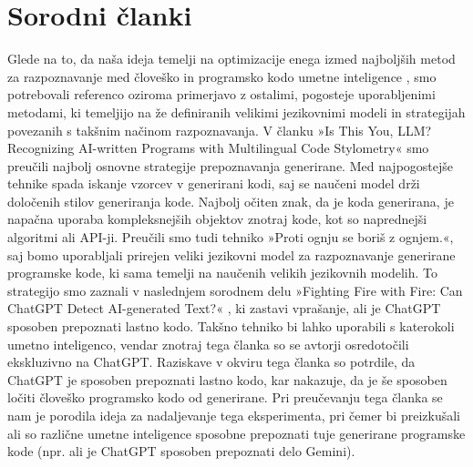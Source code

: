 \documentclass[sigconf,nonacm]{acmart}
\begin{document}
\section{Sorodni članki}
Glede na to, da naša ideja temelji na optimizacije enega izmed najboljših metod za razpoznavanje med človeško in programsko kodo umetne inteligence \cite{oedingen2024chatgpt}, smo potrebovali referenco oziroma primerjavo z ostalimi, pogosteje uporabljenimi metodami, ki temeljijo na že definiranih velikimi jezikovnimi modeli in strategijah povezanih s takšnim načinom razpoznavanja.
V članku »Is This You, LLM? Recognizing AI-written Programs with Multilingual Code Stylometry« \cite{gurioli2024you} smo preučili najbolj osnovne strategije prepoznavanja generirane. Med najpogostejše tehnike spada iskanje vzorcev v generirani kodi, saj se naučeni model drži določenih stilov generiranja kode. Najbolj očiten znak, da je koda generirana, je napačna uporaba kompleksnejših objektov znotraj kode, kot so naprednejši algoritmi ali API-ji.
Preučili smo tudi tehniko »Proti ognju se boriš z ognjem.«, saj bomo uporabljali prirejen veliki jezikovni model za razpoznavanje generirane programske kode, ki sama temelji na naučenih velikih jezikovnih modelih. To strategijo smo zaznali v naslednjem sorodnem delu »Fighting Fire with Fire: Can ChatGPT Detect AI-generated Text?« \cite{bhattacharjee2024fighting}, ki zastavi vprašanje, ali je ChatGPT sposoben prepoznati lastno kodo. Takšno tehniko bi lahko uporabili s katerokoli umetno inteligenco, vendar znotraj tega članka so se avtorji osredotočili ekskluzivno na ChatGPT. Raziskave v okviru tega članka so potrdile, da ChatGPT je sposoben prepoznati lastno kodo, kar nakazuje, da je še sposoben ločiti človeško programsko kodo od generirane. Pri preučevanju tega članka se nam je porodila ideja za nadaljevanje tega eksperimenta, pri čemer bi preizkušali ali so različne umetne inteligence sposobne prepoznati tuje generirane programske kode (npr. ali je ChatGPT sposoben prepoznati delo Gemini)\cite{rane2024gemini}.




\end{document}
